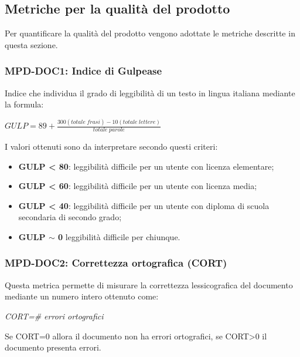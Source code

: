 \subsection{Metriche per la qualità del prodotto} \label{_metricheprodotto}
Per quantificare la qualità del prodotto vengono adottate le metriche descritte in questa sezione.
\subsubsection{MPD-DOC1: Indice di Gulpease}
Indice che individua il grado di leggibilità di un testo in lingua italiana mediante la formula:
\begin{center}
    \(GULP=89+\frac{300(totale\; frasi)-10(totale\; lettere)}{totale\; parole}\)
\end{center}
I valori ottenuti sono da interpretare secondo questi criteri:
\begin{itemize}
    \item \textbf{GULP < 80}: leggibilità difficile per un utente con licenza elementare;
    \item \textbf{GULP < 60}: leggibilità difficile per un utente con licenza media;
    \item \textbf{GULP < 40}: leggibilità difficile per un utente con diploma di scuola secondaria di secondo grado;
    \item \textbf{GULP \(\sim\) 0} leggibilità difficile per chiunque.
\end{itemize}

\subsubsection{MPD-DOC2: Correttezza ortografica (CORT)}
Questa metrica permette di misurare la correttezza lessicografica del documento mediante un numero intero ottenuto come:
\begin{center}
    \textit{CORT=\# errori ortografici}
\end{center}
Se CORT=0 allora il documento non ha errori ortografici, se CORT>0 il documento presenta errori.